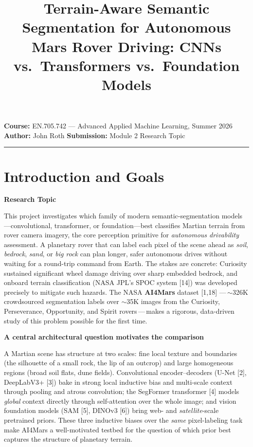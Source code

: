 \documentclass[11pt]{article}
\title{\vspace{-1.2cm}\bfseries Terrain-Aware Semantic Segmentation for Autonomous Mars
Rover Driving: CNNs vs.\ Transformers vs.\ Foundation Models}
\author{}
\date{}
\newcommand{\hdr}[1]{\medskip\noindent\textbf{#1}\par\nopagebreak}
\begin{document}
\maketitle
\vspace{-1.3cm}
\noindent\textbf{Course:} EN.705.742 --- Advanced Applied Machine Learning, Summer 2026
\quad\textbf{Author:} John Roth \quad\textbf{Submission:} Module 2 Research Topic
\par\smallskip\noindent\rule{0.45\textwidth}{0.4pt}

\section{Introduction and Goals}

\hdr{Research Topic}
This project investigates which family of modern semantic-segmentation
models---convolutional, transformer, or foundation---best classifies Martian terrain from rover
camera imagery, the core perception primitive for \emph{autonomous drivability} assessment. A
planetary rover that can label each pixel of the scene ahead as \emph{soil}, \emph{bedrock},
\emph{sand}, or \emph{big rock} can plan longer, safer autonomous drives without waiting for a
round-trip command from Earth. The stakes are concrete: Curiosity sustained significant wheel damage
driving over sharp embedded bedrock, and onboard terrain classification (NASA JPL's SPOC system
[14]) was developed precisely to mitigate such hazards. The NASA \textbf{AI4Mars} dataset [1,18]
---\,$\sim$326K crowdsourced segmentation labels over $\sim$35K images from the Curiosity,
Perseverance, Opportunity, and Spirit rovers\,---\,makes a rigorous, data-driven study of this
problem possible for the first time.

\hdr{A central architectural question motivates the comparison}
A Martian scene has structure at two scales: fine local texture and boundaries (the silhouette of a
small rock, the lip of an outcrop) and large homogeneous regions (broad soil flats, dune fields).
Convolutional encoder--decoders (U-Net [2], DeepLabV3+ [3]) bake in strong local inductive bias and
multi-scale context through pooling and atrous convolution; the SegFormer transformer [4] models
\emph{global} context directly through self-attention over the whole image; and vision foundation
models (SAM [5], DINOv3 [6]) bring web- and \emph{satellite}-scale pretrained priors. These three
inductive biases over the \emph{same} pixel-labeling task make AI4Mars a well-motivated testbed for
the question of which prior best captures the structure of planetary terrain.
\end{document}
